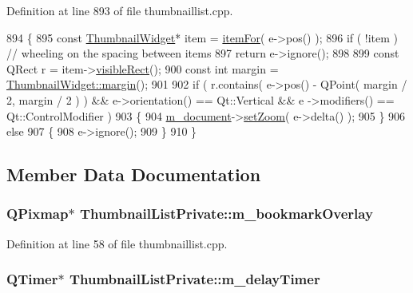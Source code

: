 Definition at line 893 of file thumbnaillist.\+cpp.


\begin{DoxyCode}
894 \{
895     \textcolor{keyword}{const} \hyperlink{classThumbnailWidget}{ThumbnailWidget}* item = \hyperlink{classThumbnailListPrivate_aa6c59ee38d152b0f0fd8e1c0883b1418}{itemFor}( e->pos() );
896     \textcolor{keywordflow}{if} ( !item ) \textcolor{comment}{// wheeling on the spacing between items}
897         \textcolor{keywordflow}{return} e->ignore();
898 
899     \textcolor{keyword}{const} QRect r = item->\hyperlink{classThumbnailWidget_a0258d51d26bdcf3b645514239768e1c7}{visibleRect}();
900     \textcolor{keyword}{const} \textcolor{keywordtype}{int} margin = \hyperlink{classThumbnailWidget_a0837afdc1f853e05f18fbaf663cda818}{ThumbnailWidget::margin}();
901 
902     \textcolor{keywordflow}{if} ( r.contains( e->pos() - QPoint( margin / 2, margin / 2 ) ) && e->orientation() == Qt::Vertical && e
      ->modifiers() == Qt::ControlModifier )
903     \{
904         \hyperlink{classThumbnailListPrivate_ae19b3e09f87437e8d485d0e039a52b08}{m\_document}->\hyperlink{classOkular_1_1Document_a140faece783310fdcbd94eaf3c5ac422}{setZoom}( e->delta() );
905     \}
906     \textcolor{keywordflow}{else}
907     \{
908         e->ignore();
909     \}
910 \}
\end{DoxyCode}


\subsection{Member Data Documentation}
\hypertarget{classThumbnailListPrivate_a87f8be2fdcdd496791316b4e4b87f007}{
\subsubsection[{m\+\_\+bookmark\+Overlay}]{\setlength{\rightskip}{0pt plus 5cm}Q\+Pixmap$\ast$ Thumbnail\+List\+Private\+::m\+\_\+bookmark\+Overlay}}\label{classThumbnailListPrivate_a87f8be2fdcdd496791316b4e4b87f007}


Definition at line 58 of file thumbnaillist.\+cpp.

\hypertarget{classThumbnailListPrivate_a794d68d7044c33698b4b4db62d115702}{
\subsubsection[{m\+\_\+delay\+Timer}]{\setlength{\rightskip}{0pt plus 5cm}Q\+Timer$\ast$ Thumbnail\+List\+Private\+::m\+\_\+delay\+Timer}}\label{classThumbnailListPrivate_a794d68d7044c33698b4b4db62d115702}


